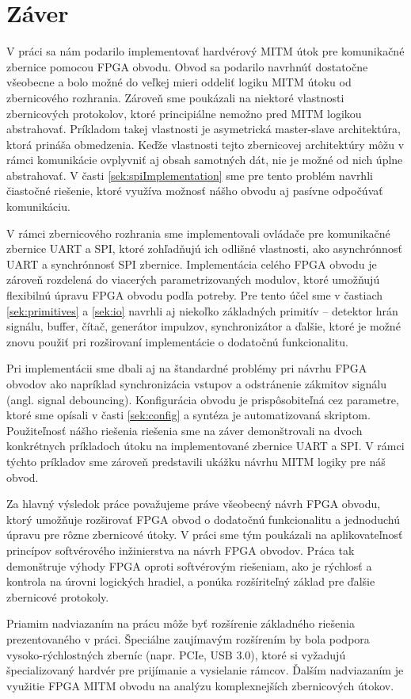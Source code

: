 \chapter*{Záver}  %

V práci sa nám podarilo implementovať hardvérový MITM útok pre komunikačné zbernice pomocou FPGA obvodu. Obvod sa podarilo navrhnúť dostatočne všeobecne a bolo možné do veľkej mieri oddeliť logiku MITM útoku od zbernicového rozhrania. Zároveň sme poukázali na niektoré vlastnosti zbernicových protokolov, ktoré principiálne nemožno pred MITM logikou abstrahovať. Príkladom takej vlastnosti je asymetrická master-slave architektúra, ktorá prináša obmedzenia. Keďže vlastnosti tejto zbernicovej architektúry môžu v rámci komunikácie ovplyvniť aj obsah samotných dát, nie je možné od nich úplne abstrahovať. V časti \ref{sek:spiImplementation} sme pre tento problém navrhli čiastočné riešenie, ktoré využíva možnosť nášho obvodu aj pasívne odpočúvať komunikáciu.

V rámci zbernicového rozhrania sme implementovali ovládače pre komunikačné zbernice UART a SPI, ktoré zohľadňujú ich odlišné vlastnosti, ako asynchrónnosť UART a synchrónnosť SPI zbernice. Implementácia celého FPGA obvodu je zároveň rozdelená do viacerých parametrizovaných modulov, ktoré umožňujú flexibilnú úpravu FPGA obvodu podľa potreby. Pre tento účel sme v častiach \ref{sek:primitives} a \ref{sek:io} navrhli aj niekoľko základných primitív -- detektor hrán signálu, buffer, čítač, generátor impulzov, synchronizátor a ďalšie, ktoré je možné znovu použiť pri rozširovaní implementácie o dodatočnú funkcionalitu.

Pri implementácii sme dbali aj na štandardné problémy pri návrhu FPGA obvodov ako napríklad synchronizácia vstupov a odstránenie zákmitov signálu (angl. signal debouncing). Konfigurácia obvodu je prispôsobiteľná cez parametre, ktoré sme opísali v časti \ref{sek:config} a syntéza je automatizovaná skriptom. Použiteľnosť nášho riešenia riešenia sme na záver demonštrovali na dvoch konkrétnych príkladoch útoku na implementované zbernice UART a SPI. V rámci týchto príkladov sme zároveň predstavili ukážku návrhu MITM logiky pre náš obvod.

Za hlavný výsledok práce považujeme práve všeobecný návrh FPGA obvodu, ktorý umožňuje rozširovať FPGA obvod o dodatočnú funkcionalitu a jednoduchú úpravu pre rôzne zbernicové útoky. V práci sme tým poukázali na aplikovateľnosť princípov softvérového inžinierstva na návrh FPGA obvodov. Práca tak demonštruje výhody FPGA oproti softvérovým riešeniam, ako je rýchlosť a kontrola na úrovni logických hradiel, a ponúka rozšíriteľný základ pre ďalšie zbernicové protokoly.

Priamim nadviazaním na prácu môže byť rozšírenie základného riešenia prezentovaného v práci. Špeciálne zaujímavým rozšírením by bola podpora vysoko-rýchlostných zberníc (napr. PCIe, USB 3.0), ktoré si vyžadujú špecializovaný hardvér pre prijímanie a vysielanie rámcov. Ďalším nadviazaním je využitie FPGA MITM obvodu na analýzu komplexnejších zbernicových útokov.
